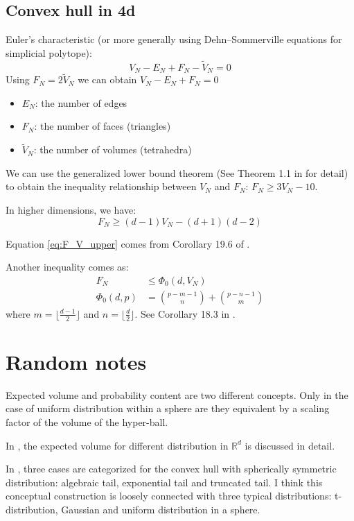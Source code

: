 \documentclass{article}
\def\R{\mathbb{R}}
\begin{document}
\subsection{Convex hull in 4d}
Euler's characteristic
(or more generally using Dehn–Sommerville equations
for simplicial polytope):
\begin{equation}
    V_N - E_N + F_N - \tilde{V}_N = 0
\end{equation}   
Using $F_N = 2 \tilde{V}_N$
we can obtain $V_N - E_N + F_N = 0$
\begin{itemize}
    \item $E_N$: the number of edges
    \item $F_N$: the number of faces (triangles)
    \item $\tilde{V}_N$: the number of volumes (tetrahedra)
\end{itemize}
We can use the generalized lower bound theorem
(See Theorem 1.1 in \cite{juhnke2018balanced} for detail) to obtain the
inequality relationship between $V_N$ and $F_N$: $F_N \geq 3V_N - 10$.

In higher dimensions, we have:
\begin{equation}\label{eq:F_V_upper}
    F_N \geq (d-1) V_N - (d+1)(d-2)
\end{equation}

Equation \eqref{eq:F_V_upper} comes from
Corollary 19.6 of \cite{brondsted2012introduction}.

Another inequality comes as:
\begin{align}
    F_N & \leq \Phi_0(d, V_N) \\
    \Phi_0(d,p) & = \binom{p-m-1}{n}
    + \binom{p-n-1}{m}
\end{align}
where $m=\lfloor \frac{d-1}{2} \rfloor$
and $n=\lfloor \frac{d}{2} \rfloor$.
See Corollary 18.3 in \cite{brondsted2012introduction}.

\section{Random notes}
Expected volume and probability content are two different concepts.
Only in the case of uniform distribution within a sphere are they equivalent
by a scaling factor of the volume of the hyper-ball.

In \cite{affentranger1991convex},
the expected volume for different distribution in $\R^d$ is discussed in detail.

In \cite{eddy1981convex}, three cases are
categorized for the convex hull with spherically symmetric
distribution: algebraic tail, exponential tail and truncated tail.
I think this conceptual construction is
loosely connected with three typical distributions:
t-distribution, Gaussian and uniform distribution in a sphere.
\end{document}
